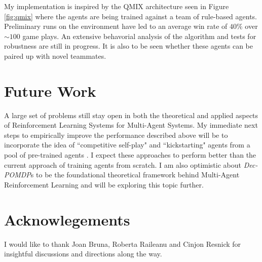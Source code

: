 \documentclass[12pt,a4paper]{article}
\begin{document}
My implementation is inspired by the QMIX architecture seen in Figure \ref{fig:qmix} where the
agents are being trained against a team of rule-based agents. Preliminary runs on the 
environment have led to an average win rate of $40\%$ over $\sim100$ game plays.
An extensive behavorial analysis of the algorithm and tests for robustness are still in progress.
It is also to be seen whether these agents can be paired up with novel teammates.

\section{Future Work} \label{section:future}

A large set of problems still stay open in both the theoretical and applied aspects of
Reinforcement Learning Systems for Multi-Agent Systems. My immediate next steps
to empirically improve the performance described above will be to incorporate the idea
of ``competitive self-play" \cite{2017arXiv171003748B} and ``kickstarting" agents from a
pool of pre-trained agents \cite{2018arXiv180303835S}. I expect these approaches to perform
better than the current approach of training agents from scratch. I am also optimistic about
\textit{Dec-POMDP}s to be the foundational theoretical framework behind Multi-Agent
Reinforcement Learning and will be exploring this topic further.

\section*{Acknowlegements} \label{section:ack}

I would like to thank Joan Bruna, Roberta Raileanu and Cinjon Resnick for insightful discussions
and directions along the way.


\end{document}
